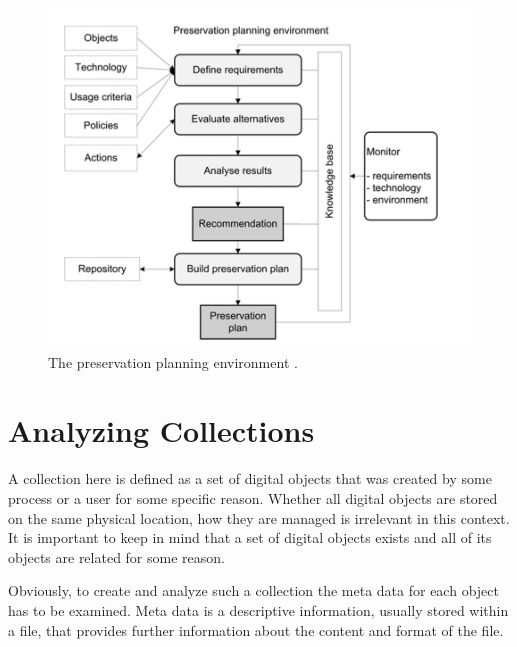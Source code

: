 \begin{figure}[tbh]
\begin{center}
\includegraphics[width=5in]{figures/related/planningenvironment.png}
\caption{The preservation planning environment \cite{becker:2010:trustowrothy}.}
\label{fig:planenv}
\end{center}
\end{figure}



\section{Analyzing Collections}
A collection here is defined as a set of digital objects that was created by some process or a user for some specific reason. Whether all digital objects are stored on the same physical location, how they are managed is irrelevant in this context. It is important to keep in mind that a set of digital objects exists and all of its objects are related for some reason.

Obviously, to create and analyze such a collection the meta data for each object has to be examined. Meta data is a descriptive information, usually stored within a file, that provides further information about the content and format of the file.

